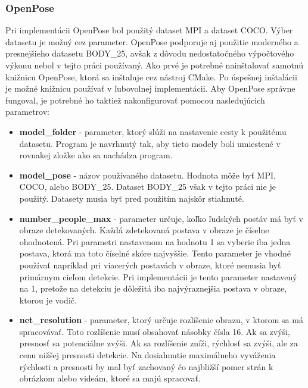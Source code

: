 \documentclass[slovak,master,dept460,male,cpp,cpdeclaration]{diploma}
\begin{document}
\subsubsection*{OpenPose}
 Pri implementácii OpenPose bol použitý dataset MPI a dataset COCO. Výber datasetu je možný cez parameter. OpenPose podporuje aj použitie moderného a presnejšieho datasetu BODY\_25, avšak z dôvodu nedostatočného výpočtového výkonu nebol v tejto práci používaný. Ako prvé je potrebné nainštalovať samotnú knižnicu OpenPose, ktorá sa inštaluje cez  nástroj CMake. Po úspešnej inštalácii je možné  knižnicu používať v ľubovolnej  implementácii. Aby OpenPose správne fungoval, je potrebné ho taktiež nakonfigurovať pomocou nasledujúcich parametrov:
 \begin{itemize}
\item \textbf{model\_folder} - parameter, ktorý slúži na nastavenie cesty k použitému  datasetu. Program je navrhnutý tak, aby  tieto modely boli umiestené v rovnakej zložke ako sa nachádza program. 
\item \textbf{model\_pose} - názov používaného datasetu. Hodnota môže  byť MPI, COCO, alebo BODY\_25. Dataset  BODY\_25 však v tejto práci nie je použitý. Datasety musia byť pred použitím najskôr stiahnuté.
\item \textbf{number\_people\_max} - parameter určuje, koľko ľudských postáv má byť v obraze detekovaných. Každá zdetekovaná postava v obraze je číselne ohodnotená. Pri parametri nastavenom na hodnotu 1 sa vyberie iba jedna postava, ktorá ma toto číselné skóre najvyššie. Tento parameter je vhodné používať napríklad pri viacerých postavách v obraze, ktoré nemusia byť primárnym cieľom detekcie. Pri implementácii je tento parameter nastavený na 1, pretože na detekciu je dôležitá iba najvýraznejšia postava v obraze, ktorou je vodič.
\item \textbf{net\_resolution} - parameter, ktorý určuje rozlíšenie  obrazu, v ktorom sa má spracovávať. Toto rozlíšenie  musí obsahovať násobky čísla 16. Ak sa zvýši, presnosť sa potenciálne zvýši. Ak sa rozlíšenie zníži, rýchlosť sa zvýši, ale za cenu nižšej presnosti detekcie.  Na dosiahnutie maximálneho vyváženia rýchlosti a presnosti by mal byť zachovaný čo najbližší pomer strán k obrázkom alebo videám, ktoré sa majú spracovať.
\end{itemize}
\end{document}
